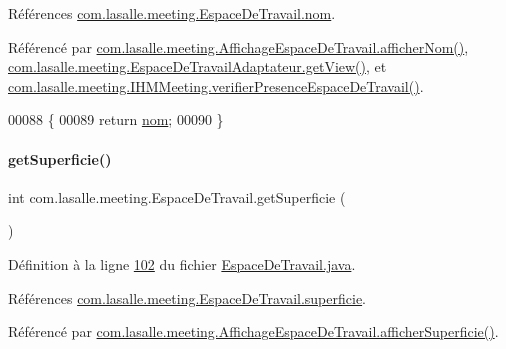 Références \hyperlink{_espace_de_travail_8java_source_l00032}{com.\+lasalle.\+meeting.\+Espace\+De\+Travail.\+nom}.



Référencé par \hyperlink{_affichage_espace_de_travail_8java_source_l00061}{com.\+lasalle.\+meeting.\+Affichage\+Espace\+De\+Travail.\+afficher\+Nom()}, \hyperlink{_espace_de_travail_adaptateur_8java_source_l00040}{com.\+lasalle.\+meeting.\+Espace\+De\+Travail\+Adaptateur.\+get\+View()}, et \hyperlink{_i_h_m_meeting_8java_source_l00248}{com.\+lasalle.\+meeting.\+I\+H\+M\+Meeting.\+verifier\+Presence\+Espace\+De\+Travail()}.


\begin{DoxyCode}
00088     \{
00089         \textcolor{keywordflow}{return} \hyperlink{classcom_1_1lasalle_1_1meeting_1_1_espace_de_travail_a9c06de6de73757cbec902e14055969ce}{nom};
00090     \}
\end{DoxyCode}
\mbox{\label{classcom_1_1lasalle_1_1meeting_1_1_espace_de_travail_ae2c734da9d454b368ddb056b1cdae499}} 
\paragraph{\texorpdfstring{get\+Superficie()}{getSuperficie()}}
{\footnotesize\ttfamily int com.\+lasalle.\+meeting.\+Espace\+De\+Travail.\+get\+Superficie (\begin{DoxyParamCaption}{ }\end{DoxyParamCaption})}



Définition à la ligne \hyperlink{_espace_de_travail_8java_source_l00102}{102} du fichier \hyperlink{_espace_de_travail_8java_source}{Espace\+De\+Travail.\+java}.



Références \hyperlink{_espace_de_travail_8java_source_l00035}{com.\+lasalle.\+meeting.\+Espace\+De\+Travail.\+superficie}.



Référencé par \hyperlink{_affichage_espace_de_travail_8java_source_l00094}{com.\+lasalle.\+meeting.\+Affichage\+Espace\+De\+Travail.\+afficher\+Superficie()}.


